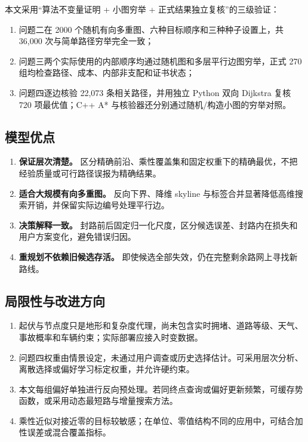 \documentclass[UTF8,a4paper]{ctexart}
\begin{document}
本文采用“算法不变量证明 + 小图穷举 + 正式结果独立复核”的三级验证：

\begin{enumerate}
  \item 问题二在 2000 个随机有向多重图、六种目标顺序和三种种子设置上，共 36,000 次与简单路径穷举完全一致；
  \item 问题三两个实际使用的内部顺序均通过随机图和多层平行边图穷举，正式 270 组均检查路径、成本、内部非支配和证书状态；
  \item 问题四逐边核验 22,073 条相关路径，并用独立 Python 双向 Dijkstra 复核 720 项最优值；C++ A* 与核验器还分别通过随机/构造小图的穷举对照。
\end{enumerate}

\subsection{模型优点}

\begin{enumerate}
  \item \textbf{保证层次清楚。} 区分精确前沿、乘性覆盖集和固定权重下的精确最优，不把经验质量或可行路径误报为精确结果。
  \item \textbf{适合大规模有向多重图。} 反向下界、降维 skyline 与标签合并显著降低高维搜索开销，并保留实际边编号处理平行边。
  \item \textbf{决策解释一致。} 封路前后固定归一化尺度，区分候选误差、封路内在损失和用户方案变化，避免错误归因。
  \item \textbf{重规划不依赖旧候选存活。} 即使候选全部失效，仍在完整剩余路网上寻找新路线。
\end{enumerate}

\subsection{局限性与改进方向}

\begin{enumerate}
  \item 起伏与节点度只是地形和复杂度代理，尚未包含实时拥堵、道路等级、天气、事故概率和车辆约束；实际部署应接入时变数据。
  \item 问题四权重由情景设定，未通过用户调查或历史选择估计。可采用层次分析、离散选择或偏好学习标定权重，并允许硬约束。
  \item 本文每组偏好单独进行反向预处理。若同终点查询或偏好更新频繁，可缓存势函数，或采用动态最短路与增量搜索方法。
  \item 乘性近似对接近零的目标较敏感；在单位、零值结构不同的应用中，可结合加性误差或混合覆盖指标。
\end{enumerate}
\end{document}
